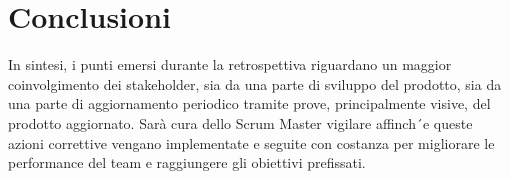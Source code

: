 \documentclass{article}
\begin{document}
\section*{Conclusioni}
In sintesi, i punti emersi durante la retrospettiva riguardano un maggior coinvolgimento dei stakeholder, sia da una parte di sviluppo del prodotto, sia da una parte di aggiornamento periodico tramite prove, principalmente visive, del prodotto aggiornato. Sarà cura dello Scrum Master vigilare affinch´e queste azioni correttive vengano implementate e seguite con costanza per migliorare le performance del team e raggiungere gli obiettivi prefissati.
\end{document}
